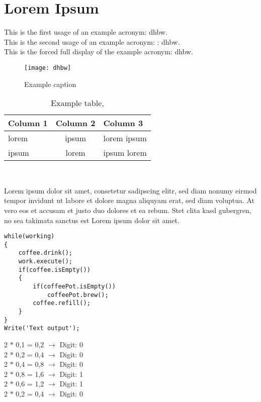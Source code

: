 \chapter{Lorem Ipsum}\label{ch:lorem-ipsum}
This is the first usage of an example acronym: \ac{dhbw}.\\
This is the second usage of an example acronym: : \ac{dhbw}.\\
This is the forced full display of the example acronym: \acf{dhbw}.

\begin{figure}[h]
    \centering
    \texttt{[image: dhbw]}
    \caption{Example caption}\label{fig:figure}
\end{figure}


\begin{table}[htbp]         %
    \begin{tabular}{lcl}        %
        \hline                  %
        \textbf{Column 1} & \textbf{Column 2} & \textbf{Column 3} \\
        \hline
        lorem             & ipsum             & lorem ipsum       \\
        ipsum             & lorem             & ipsum lorem
    \end{tabular}~\caption{Example table, \cite{lorem}}
    \label{tab:table1}
\end{table}

Lorem ipsum dolor sit amet, consetetur sadipscing elitr, sed diam nonumy eirmod tempor invidunt ut labore et dolore magna aliquyam erat, sed diam voluptua. At vero eos et accusam et justo duo dolores et ea rebum. Stet clita kasd gubergren, no sea takimata sanctus est Lorem ipsum dolor sit amet. \cite{lorem}

\newpage
\begin{lstlisting}[caption=This is a code listing,label=lst:code]
while(working)
{
    coffee.drink();
    work.execute();
    if(coffee.isEmpty())
    {
        if(coffeePot.isEmpty())
            coffeePot.brew();
        coffee.refill();
    }
}
Write('Text output');
\end{lstlisting}


\begin{center}
    2 $\ast$ 0,1 = 0,2 $\rightarrow$ Digit: 0 \\
    2 $\ast$ 0,2 = 0,4 $\rightarrow$ Digit: 0 \\
    2 $\ast$ 0,4 = 0,8 $\rightarrow$ Digit: 0 \\
    2 $\ast$ 0,8 = 1,6 $\rightarrow$ Digit: 1 \\
    2 $\ast$ 0,6 = 1,2 $\rightarrow$ Digit: 1 \\
    2 $\ast$ 0,2 = 0,4 $\rightarrow$ Digit: 0 \\
\end{center}


